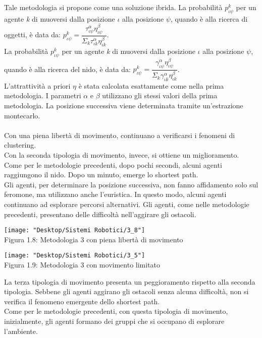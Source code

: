 \documentclass[12pt,a4paper,openright,twoside]{report}
\begin{document}
Tale metodologia si propone come una soluzione ibrida. La probabilità $p^k_{\iota\psi}$ per un agente \textit{k} di muoversi dalla posizione $\iota$ alla posizione $\psi$, quando è alla ricerca di oggetti, è data da: $p^k_{\iota\psi}= \dfrac{\tau^\alpha_{\iota\psi}\eta^\beta_{\iota\psi}}{\Sigma_k\tau^\alpha_{\iota k}\eta^\beta_{\iota k}}$. \\
La probabilità $p^k_{\iota\psi}$ per un agente \textit{k} di muoversi dalla posizione $\iota$ alla posizione $\psi$, quando è alla ricerca del nido, è data da: $p^k_{\iota\psi}= \dfrac{\gamma^\alpha_{\iota\psi}\eta^\beta_{\iota\psi}}{\Sigma_k\gamma^\alpha_{\iota k}\eta^\beta_{\iota k}}$. \\
L'attrattività a priori $\eta$ è stata calcolata esattamente come nella prima metodologia. I parametri $\alpha$ e $\beta$ utilizzano gli stessi valori della prima metodologia. La posizione successiva viene determinata tramite un'estrazione montecarlo.\\\\
Con una piena libertà di movimento, continuano a verificarsi i fenomeni di clustering.\\
Con la seconda tipologia di movimento, invece, si ottiene un miglioramento. Come per le metodologie precedenti, dopo pochi secondi, alcuni agenti raggiungono il nido. Dopo un minuto, emerge lo shortest path.\\ 
Gli agenti, per determinare la posizione successiva, non fanno affidamento solo sul feromone, ma utilizzano anche l'euristica. In questo modo, alcuni agenti continuano ad esplorare percorsi alternativi. Gli agenti, come nelle metodologie precedenti, presentano delle difficoltà nell'aggirare gli ostacoli.\\

\begin{center}  
	\texttt{[image: "Desktop/Sistemi Robotici/3\_8"]}
	\\Figura 1.8: Metodologia 3 con piena libertà di movimento
\end{center}


\begin{center}  
	\texttt{[image: "Desktop/Sistemi Robotici/3\_5"]}
	\\Figura 1.9: Metodologia 3 con movimento limitato
\end{center}

La terza tipologia di movimento presenta un peggioramento rispetto alla seconda tipologia. Sebbene gli agenti aggirano gli ostacoli senza alcuna difficoltà, non si verifica il fenomeno emergente dello shortest path.\\Come per le metodologie precedenti, con questa tipologia di movimento, inizialmente, gli agenti formano dei gruppi che si occupano di esplorare l'ambiente.\\
\end{document}

